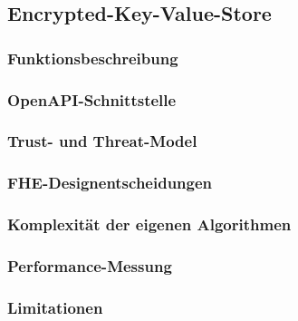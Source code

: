 \subsection{Encrypted-Key-Value-Store}
\label{sub:encrypted_key_value_store}

\subsubsection{Funktionsbeschreibung}

\subsubsection{OpenAPI-Schnittstelle}

\subsubsection{Trust- und Threat-Model}

\subsubsection{FHE-Designentscheidungen}

\subsubsection{Komplexität der eigenen Algorithmen}

\subsubsection{Performance-Messung}

\subsubsection{Limitationen}